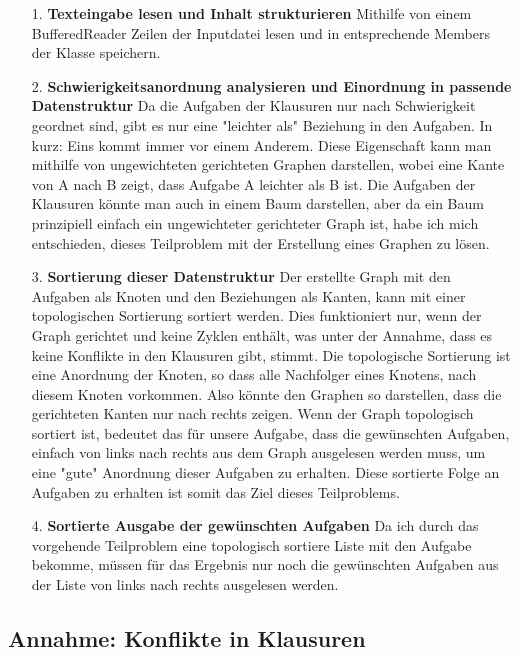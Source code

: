\documentclass[a4paper,10pt,ngerman]{scrartcl}
\begin{document}
\begin{itemize}
  \item[1.] \textbf{Texteingabe lesen und Inhalt strukturieren}
  \newline
  Mithilfe von einem BufferedReader Zeilen der Inputdatei lesen und in entsprechende Members der Klasse speichern.
  \item[2.] \textbf{Schwierigkeitsanordnung analysieren und Einordnung in passende Datenstruktur}
  \newline
  Da die Aufgaben der Klausuren nur nach Schwierigkeit geordnet sind, gibt es nur eine "leichter als" Beziehung in den Aufgaben. In kurz: Eins kommt immer vor einem Anderem.
  Diese Eigenschaft kann man mithilfe von ungewichteten gerichteten Graphen darstellen, wobei eine Kante von A nach B zeigt, dass Aufgabe A leichter als B ist. Die Aufgaben der Klausuren könnte man auch in einem 
  Baum darstellen, aber da ein Baum prinzipiell einfach ein ungewichteter gerichteter Graph ist, habe ich mich entschieden, dieses Teilproblem mit der Erstellung eines Graphen zu lösen.
  \item[3.] \textbf{Sortierung dieser Datenstruktur}
  \newline
  Der erstellte Graph mit den Aufgaben als Knoten und den Beziehungen als Kanten, kann mit einer topologischen Sortierung sortiert werden. Dies funktioniert nur, wenn der Graph gerichtet und keine Zyklen enthält,
  was unter der Annahme, dass es keine Konflikte in den Klausuren gibt, stimmt. Die topologische Sortierung ist eine Anordnung der Knoten, so dass alle Nachfolger eines Knotens, nach diesem Knoten vorkommen. Also könnte
  den Graphen so darstellen, dass die gerichteten Kanten nur nach rechts zeigen. Wenn der Graph topologisch sortiert ist, bedeutet das für unsere Aufgabe, dass die gewünschten Aufgaben, einfach von links nach rechts
  aus dem Graph ausgelesen werden muss, um eine "gute" Anordnung dieser Aufgaben zu erhalten. Diese sortierte Folge an Aufgaben zu erhalten ist somit das Ziel dieses Teilproblems. 
  \item[4.] \textbf{Sortierte Ausgabe der gewünschten Aufgaben}
  Da ich durch das vorgehende Teilproblem eine topologisch sortiere Liste mit den Aufgabe bekomme, müssen für das Ergebnis nur noch die gewünschten Aufgaben aus der Liste von links nach rechts ausgelesen werden.
\end{itemize}

\subsection{Annahme: Konflikte in Klausuren}
\end{document}
